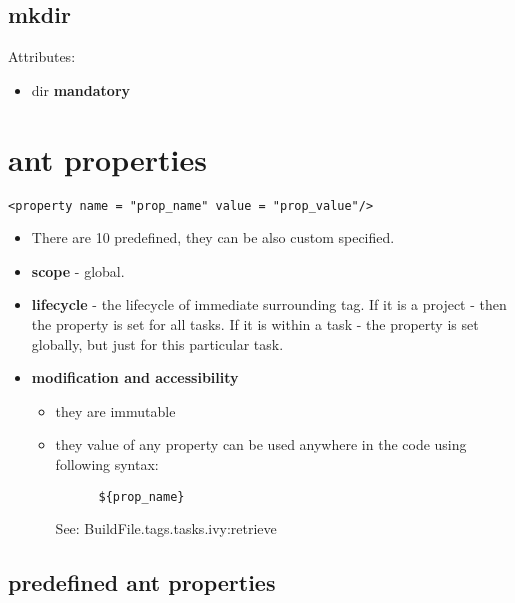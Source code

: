 \documentclass{report}
\begin{document}
\subsection{mkdir}
Attributes:
\begin{itemize}
  \item dir \textbf{mandatory}
\end{itemize}

\section{ant properties}

\begin{verbatim}
<property name = "prop_name" value = "prop_value"/>
\end{verbatim}

\begin{itemize}
  \item There are 10 predefined, 
  they can be also custom specified. 
  \item \textbf{scope} - global.
  \item \textbf{lifecycle} - the lifecycle of immediate surrounding tag.
  If it is a project - then the property is set for all tasks. If it is within a task - the property
  is set globally, but just for this particular task.
  \item \textbf{modification and accessibility}
  	\begin{itemize}
  	  \item they are immutable
  	  \item they value of any property can be used anywhere in the code using
  	  following syntax:
  	  \begin{verbatim}
  	  ${prop_name}
  	  \end{verbatim}
  	  See: BuildFile.tags.tasks.ivy:retrieve
  	  \end{itemize}
\end{itemize}

\subsection{predefined ant properties}
\end{document}
